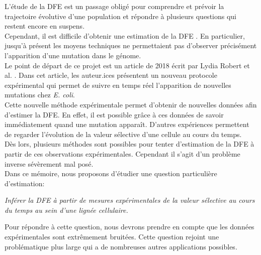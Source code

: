     L'étude de la DFE est un passage obligé pour comprendre et prévoir la trajectoire évolutive d'une population et répondre à plusieurs questions qui restent encore en suspens.\\
    
    Cependant, il est difficile d'obtenir une estimation de la DFE \cite{bataillon2014effects}. En particulier, jusqu'à présent les moyens techniques ne permettaient pas d'observer précisément l'apparition d'une mutation dans le génome. \\
    


    Le point de départ de ce projet est un article de 2018 écrit par Lydia Robert et al. \cite{robert2018mutation}. Dans cet article, les auteur.ices présentent un nouveau protocole expérimental qui permet de suivre en temps réel l'apparition de nouvelles mutations chez \textit{E. coli}. \\
    
    Cette nouvelle méthode expérimentale permet d'obtenir de nouvelles données  afin d'estimer la DFE. En effet, il est possible grâce à ces données de savoir immédiatement quand une mutation apparaît. D'autres expériences permettent de regarder l'évolution de la valeur sélective d'une cellule au cours du temps. \\
    
    Dès lors, plusieurs méthodes sont possibles pour tenter d'estimation de la DFE à partir de ces observations expérimentales. Cependant il s'agit d'un problème inverse sévèrement mal posé. \\
    
    Dans ce mémoire, nous proposons d’étudier une question particulière d’estimation: 
    
        \begin{center}
            \textit{Inférer la DFE à partir de mesures expérimentales de la valeur sélective au cours du temps au sein d'une lignée cellulaire.}
        \end{center}
        
    Pour répondre à cette question, nous devrons prendre en compte que les données expérimentales sont extrêmement  bruitées. 
    Cette question rejoint une problématique plus large qui a de nombreuses autres applications possibles. \\



